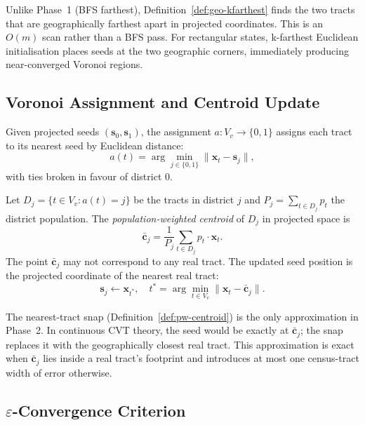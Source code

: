 Unlike Phase~1 (BFS farthest), Definition~\ref{def:geo-kfarthest} finds the
two tracts that are geographically farthest apart in projected coordinates.
This is an $O(m)$ scan rather than a BFS pass.
For rectangular states, k-farthest Euclidean initialisation places seeds at
the two geographic corners, immediately producing near-converged Voronoi
regions.

\subsection{Voronoi Assignment and Centroid Update}

\begin{definition}
\label{def:euc-voronoi}
Given projected seeds $(\mathbf{s}_0, \mathbf{s}_1)$, the assignment
$a: V_v \to \{0,1\}$ assigns each tract to its nearest seed by Euclidean distance:
\[
  a(t) = \arg\min_{j \in \{0,1\}} \|\mathbf{x}_t - \mathbf{s}_j\|,
\]
with ties broken in favour of district 0.
\end{definition}

\begin{definition}
\label{def:pw-centroid}
Let $D_j = \{t \in V_v : a(t) = j\}$ be the tracts in district $j$ and
$P_j = \sum_{t \in D_j} p_t$ the district population.
The \emph{population-weighted centroid} of $D_j$ in projected space is
\[
  \bar{\mathbf{c}}_j = \frac{1}{P_j}\sum_{t \in D_j} p_t \cdot \mathbf{x}_t.
\]
The point $\bar{\mathbf{c}}_j$ may not correspond to any real tract.
The updated seed position is the projected coordinate of the nearest real tract:
\[
  \mathbf{s}_j \leftarrow \mathbf{x}_{t^*},
  \quad t^* = \arg\min_{t \in V_v} \|\mathbf{x}_t - \bar{\mathbf{c}}_j\|.
\]
\end{definition}

The nearest-tract snap (Definition~\ref{def:pw-centroid}) is the only
approximation in Phase~2.
In continuous CVT theory, the seed would be exactly at $\bar{\mathbf{c}}_j$;
the snap replaces it with the geographically closest real tract.
This approximation is exact when $\bar{\mathbf{c}}_j$ lies inside a real tract's
footprint and introduces at most one census-tract width of error otherwise.

\subsection{\texorpdfstring{$\varepsilon$-Convergence Criterion}{Epsilon-Convergence Criterion}}

